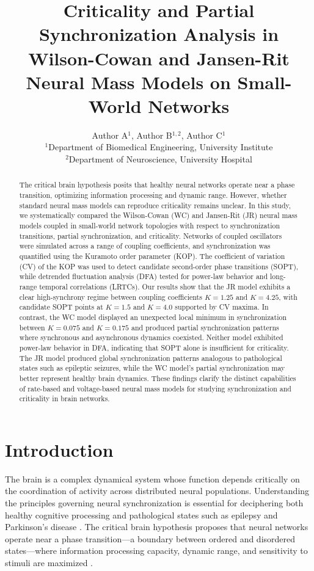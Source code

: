 \documentclass[12pt]{article}
\title{Criticality and Partial Synchronization Analysis in Wilson-Cowan and Jansen-Rit Neural Mass Models on Small-World Networks}
\author{Author A$^{1}$, Author B$^{1,2}$, Author C$^{1}$ \\
\small $^{1}$Department of Biomedical Engineering, University Institute \\
\small $^{2}$Department of Neuroscience, University Hospital}
\date{}
\begin{document}
\maketitle

\begin{abstract}
The critical brain hypothesis posits that healthy neural networks operate near a phase transition, optimizing information processing and dynamic range. However, whether standard neural mass models can reproduce criticality remains unclear. In this study, we systematically compared the Wilson-Cowan (WC) and Jansen-Rit (JR) neural mass models coupled in small-world network topologies with respect to synchronization transitions, partial synchronization, and criticality. Networks of coupled oscillators were simulated across a range of coupling coefficients, and synchronization was quantified using the Kuramoto order parameter (KOP). The coefficient of variation (CV) of the KOP was used to detect candidate second-order phase transitions (SOPT), while detrended fluctuation analysis (DFA) tested for power-law behavior and long-range temporal correlations (LRTCs). Our results show that the JR model exhibits a clear high-synchrony regime between coupling coefficients $K = 1.25$ and $K = 4.25$, with candidate SOPT points at $K = 1.5$ and $K = 4.0$ supported by CV maxima. In contrast, the WC model displayed an unexpected local minimum in synchronization between $K = 0.075$ and $K = 0.175$ and produced partial synchronization patterns where synchronous and asynchronous dynamics coexisted. Neither model exhibited power-law behavior in DFA, indicating that SOPT alone is insufficient for criticality. The JR model produced global synchronization patterns analogous to pathological states such as epileptic seizures, while the WC model's partial synchronization may better represent healthy brain dynamics. These findings clarify the distinct capabilities of rate-based and voltage-based neural mass models for studying synchronization and criticality in brain networks.
\end{abstract}

\section{Introduction}

The brain is a complex dynamical system whose function depends critically on the coordination of activity across distributed neural populations. Understanding the principles governing neural synchronization is essential for deciphering both healthy cognitive processing and pathological states such as epilepsy and Parkinson's disease \citep{uhlhaas2006neural, jiruska2013synchronization}. The critical brain hypothesis proposes that neural networks operate near a phase transition---a boundary between ordered and disordered states---where information processing capacity, dynamic range, and sensitivity to stimuli are maximized \citep{beggs2003neuronal, chialvo2010emergent}.
\end{document}
